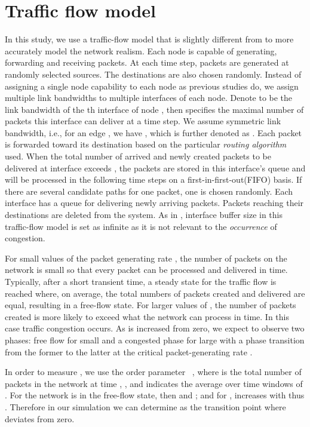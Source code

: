 \documentclass[journal]{IEEEtran}
\begin{document}
{\section{Traffic flow model}\label{model}
 In this study, we use a traffic-flow model that is slightly
 different from
\cite{efficient-routing, edge-deletion,
onset-traffic-congestion,Danila06} to more accurately model the
network realism. Each node is capable of generating, forwarding and
receiving packets. At each time step,  packets are generated at
randomly selected sources. The destinations are also chosen
randomly. Instead of assigning a single node capability to each node
as previous studies do, we assign multiple link bandwidths to
multiple interfaces of each node. Denote  to be the link
bandwidth of the th interface of node , then 
specifies the maximal number of packets this interface can deliver
at a time step. We assume symmetric link bandwidth, i.e., for an
edge , we have , which is further
denoted as .  Each packet is forwarded toward its destination
based on the particular \emph{routing algorithm} used. When the
total number of arrived and newly created packets to be delivered at
interface  exceeds , the packets are stored in this
interface's queue and will be processed in the following time steps
on a first-in-first-out(FIFO) basis. If there are several candidate
paths for one packet, one is chosen randomly. Each interface has a
queue for delivering newly arriving packets. Packets reaching their
destinations are deleted from the system. As in
\cite{efficient-routing, edge-deletion,
onset-traffic-congestion,Danila06}, interface buffer size in this
traffic-flow model is set as infinite as it is not relevant to the
\emph{occurrence} of congestion.

For small values of the packet generating rate , the number of
packets on the network is small so that every packet can be
processed and delivered in time. Typically, after a short transient
time, a steady state for the traffic flow is reached where, on
average, the total numbers of packets created and delivered are
equal, resulting in a free-flow state. For larger values of , the
number of packets created is more likely to exceed what the network
can process in time. In this case traffic congestion occurs. As 
is increased from zero, we expect to observe two phases: free flow
for small  and a congested phase for large  with a phase
transition from the former to the latter at the critical
packet-generating rate .

In order to measure , we use the order
parameter~\cite{Arenas01} , where  is the
total number of packets in the network at time ,
,  and
 indicates the average over time windows of
. For  the network is in the free-flow state, then
 and ; and for ,
 increases with  thus . Therefore in
our simulation we can determine  as the transition point where
 deviates from zero.


}
\end{document}
